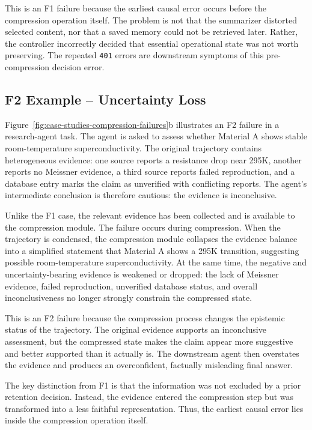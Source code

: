 This is an F1 failure because the earliest causal error occurs before the compression operation itself. 
The problem is not that the summarizer distorted selected content, nor that a saved memory could not be retrieved later. 
Rather, the controller incorrectly decided that essential operational state was not worth preserving. 
The repeated \texttt{401} errors are downstream symptoms of this pre-compression decision error.

\subsection{F2 Example -- Uncertainty Loss}
\label{app:case-f2-uncertainty-loss}

Figure~\ref{fig:case-studies-compression-failures}b illustrates an F2 failure in a research-agent task. 
The agent is asked to assess whether Material A shows stable room-temperature superconductivity. 
The original trajectory contains heterogeneous evidence: one source reports a resistance drop near 295K, another reports no Meissner evidence, a third source reports failed reproduction, and a database entry marks the claim as unverified with conflicting reports. 
The agent's intermediate conclusion is therefore cautious: the evidence is inconclusive.

Unlike the F1 case, the relevant evidence has been collected and is available to the compression module. 
The failure occurs during compression. 
When the trajectory is condensed, the compression module collapses the evidence balance into a simplified statement that Material A shows a 295K transition, suggesting possible room-temperature superconductivity. 
At the same time, the negative and uncertainty-bearing evidence is weakened or dropped: the lack of Meissner evidence, failed reproduction, unverified database status, and overall inconclusiveness no longer strongly constrain the compressed state.

This is an F2 failure because the compression process changes the epistemic status of the trajectory. 
The original evidence supports an inconclusive assessment, but the compressed state makes the claim appear more suggestive and better supported than it actually is. 
The downstream agent then overstates the evidence and produces an overconfident, factually misleading final answer.

The key distinction from F1 is that the information was not excluded by a prior retention decision. 
Instead, the evidence entered the compression step but was transformed into a less faithful representation. 
Thus, the earliest causal error lies inside the compression operation itself.

